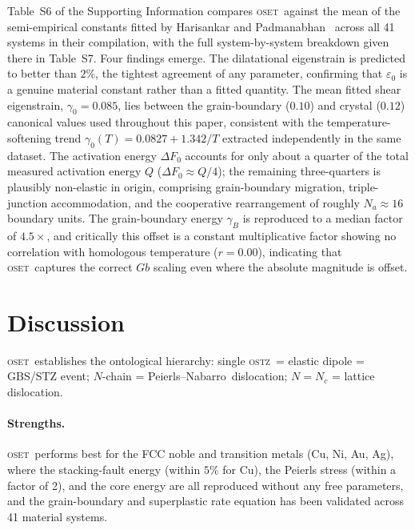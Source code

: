 \documentclass[5p,sort&compress]{elsarticle}
\newcommand{\OSTZ}{\textsc{ostz}}
\newcommand{\OSET}{\textsc{oset}}
\newcommand{\dF}{\Delta F_0}
\newcommand{\gz}{\gamma_0}
\newcommand{\PN}{Peierls--Nabarro}
\begin{document}
\label{sec:harisankar}
Table~S6 of the Supporting Information compares \OSET\ against the
mean of the semi-empirical constants fitted by Harisankar and
Padmanabhan~\cite{harisankar2025} across all 41 systems in their
compilation, with the full system-by-system breakdown given there in
Table~S7. Four findings emerge. The
dilatational eigenstrain is predicted to better than $2\%$, the
tightest agreement of any parameter, confirming that $\varepsilon_0$
is a genuine material constant rather than a fitted quantity. The
mean fitted shear eigenstrain, $\gz=0.085$, lies between the
grain-boundary ($0.10$) and crystal ($0.12$) canonical values used
throughout this paper, consistent with the temperature-softening
trend $\gz(T)=0.0827+1.342/T$ extracted independently in the same
dataset. The activation energy $\dF$ accounts for only about a
quarter of the total measured activation energy $Q$
($\dF\approx Q/4$); the remaining three-quarters is plausibly
non-elastic in origin, comprising grain-boundary migration,
triple-junction accommodation, and the cooperative rearrangement of
roughly $N_a\approx16$ boundary units. The grain-boundary energy
$\gamma_B$ is reproduced to a median factor of $4.5\times$, and
critically this offset is a constant multiplicative factor showing
no correlation with homologous temperature ($r=0.00$), indicating
that \OSET\ captures the correct $Gb$ scaling even where the
absolute magnitude is offset.

\section{Discussion}
\label{sec:discussion}

\OSET\ establishes the ontological hierarchy: single \OSTZ\ = elastic
dipole = GBS/STZ event; $N$-chain = \PN\ dislocation;
$N=N_c$ = lattice dislocation.

\paragraph{Strengths.}
\OSET\ performs best for the FCC noble and transition metals (Cu,
Ni, Au, Ag), where the stacking-fault energy (within $5\%$ for Cu),
the Peierls stress (within a factor of 2), and the core energy are
all reproduced without any free parameters, and the grain-boundary
and superplastic rate equation has been validated across 41
material systems.
\end{document}
